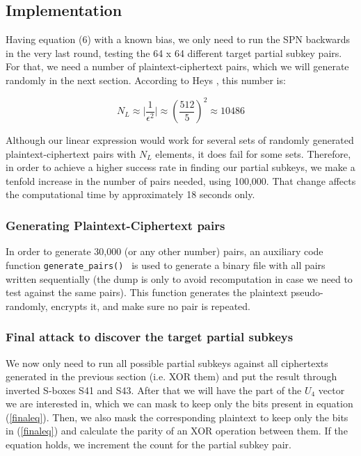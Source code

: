 \documentclass[11pt]{article}
\begin{document}
\subsection{Implementation}

Having equation (6) with a known bias, we only need to run the SPN backwards in the very last round, testing the 64 x 64 different target partial subkey pairs. For that, we need a number of plaintext-ciphertext pairs, which we will generate randomly in the next section. According to Heys \cite{heys2002tutorial}, this number is:

\begin{equation*}
N_L \approx \lvert \frac{1}{\epsilon^2} \rvert \approx (\frac{512}{5})^2 \approx 10486
\end{equation*}

Although our linear expression would work for several sets of randomly generated plaintext-ciphertext pairs with $N_L$ elements, it does fail for some sets. Therefore, in order to achieve a higher success rate in finding our partial subkeys, we make a tenfold increase in the number of pairs needed, using 100,000. That change affects the computational time by approximately 18 seconds only.

\subsubsection{Generating Plaintext-Ciphertext pairs}

In order to generate 30,000 (or any other number) pairs, an auxiliary code function {\tt generate\_pairs() } is used to generate a binary file with all pairs written sequentially (the dump is only to avoid recomputation in case we need to test against the same pairs). This function generates the plaintext pseudo-randomly, encrypts it, and make sure no pair is repeated.

\subsubsection{Final attack to discover the target partial subkeys}

We now only need to run all possible partial subkeys against all ciphertexts generated in the previous section (i.e. XOR them) and put the result through inverted S-boxes S41 and S43. After that we will have the part of the $U_4$ vector we are interested in, which we can mask to keep only the bits present in equation (\ref{finaleq}). Then, we also mask the corresponding plaintext to keep only the bits in (\ref{finaleq}) and calculate the parity of an XOR operation between them. If the equation holds, we increment the count for the partial subkey pair.
\end{document}
